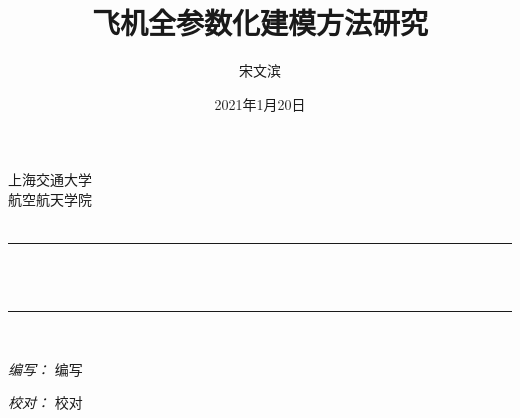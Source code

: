 \documentclass[12pt,a4paper]{report}
\title{飞机全参数化建模方法研究}
\author{宋文滨}
\date{2021年1月20日}
\begin{document}
\makeatletter



\pagestyle{fancy}
\lhead{\@title}
\renewcommand{\headrulewidth}{0.4pt}
\renewcommand{\footrulewidth}{0.4pt}

\renewcommand{\figurename}{图}
\renewcommand{\tablename}{表}
\renewcommand{\contentsname}{目录}
\renewcommand*\listfigurename{图例}
\renewcommand*\listtablename{表例}
\renewcommand{\bibname}{参考文献}

\begin{titlepage}
\newcommand{\HRule}{\rule{\linewidth}{0.1mm}} 
\center %
 
\textsc{\Large 上海交通大学}\\[0.5cm] %
\textsc{\Large 航空航天学院}\\[0.5cm] %
\textsc{\large \@title}\\[0.5cm] %
 
\HRule \\[0.4cm]
{ \huge \bfseries \@title}\\[0.1cm] %
\HRule \\[1.5cm]
 
 
\begin{minipage}{0.4\textwidth}

\begin{flushleft} \large 
\emph{编写：} 编写\\
\end{flushleft}

\begin{flushleft} \large
\emph{校对：} 校对\\
\end{flushleft}


\end{minipage}
\end{titlepage}
\end{document}
